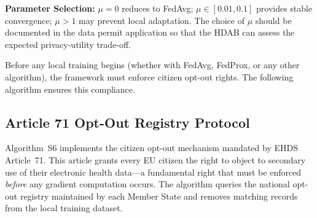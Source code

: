 \documentclass[conference]{IEEEtran}
\begin{document}
\begin{figure}[htbp]
\centering
{}
\end{figure}

\textbf{Parameter Selection:} $\mu = 0$ reduces to FedAvg; $\mu \in [0.01, 0.1]$ provides stable convergence; $\mu > 1$ may prevent local adaptation. The choice of $\mu$ should be documented in the data permit application so that the HDAB can assess the expected privacy-utility trade-off.

Before any local training begins (whether with FedAvg, FedProx, or any other algorithm), the framework must enforce citizen opt-out rights. The following algorithm ensures this compliance.

\subsection{Article 71 Opt-Out Registry Protocol}

Algorithm~S6 implements the citizen opt-out mechanism mandated by EHDS Article~71. This article grants every EU citizen the right to object to secondary use of their electronic health data---a fundamental right that must be enforced \textit{before} any gradient computation occurs. The algorithm queries the national opt-out registry maintained by each Member State and removes matching records from the local training dataset.
\end{document}
